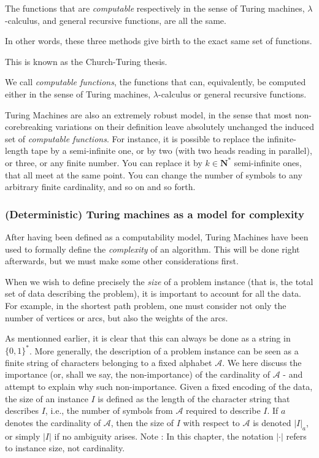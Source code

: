 \begin{theorem}
    The functions that are \textit{computable} respectively in the sense of Turing machines, $ \lambda $-calculus, and general recursive functions, are all the same. 
    
    In other words, these three methods give birth to the exact same set of functions. 
\end{theorem}

This is known as the Church-Turing thesis.

\begin{definition}
    We call \textit{computable functions}, the functions that can, equivalently, be computed either in the sense of Turing machines, $ \lambda $-calculus or general recursive functions.
\end{definition}

Turing Machines are also an extremely robust model, in the sense that most non-corebreaking variations on their definition leave absolutely unchanged the induced set of \textit{computable functions}. For instance, it is possible to replace the infinite-length tape by a semi-infinite one, or by two (with two heads reading in parallel), or three, or any finite number. You can replace it by $k \in \mathbf N^*$ semi-infinite ones, that all meet at the same point. You can change the number of symbols to any arbitrary finite cardinality, and so on and so forth.

\subsubsection{(Deterministic) Turing machines as a model for complexity}

After having been defined as a computability model, Turing Machines have been used to formally define the \textit{complexity} of an algorithm. This will be done right afterwards, but we must make some other considerations first.

When we wish to define precisely the \emph{size} of a problem instance (that is, the total set of data describing the problem), it is important to account for all the data. For example, in the shortest path problem, one must consider not only the number of vertices or arcs, but also the weights of the arcs.

As mentionned earlier, it is clear that this can always be done as a string in $ \{0,1\}^* $. More generally, the description of a problem instance can be seen as a finite string of characters belonging to a fixed alphabet \( \mathcal A \). We here discuss the importance (or, shall we say, the non-importance) of the cardinality of \( \mathcal A \) - and attempt to explain why such non-importance. Given a fixed encoding of the data, the size of an instance \( I \) is defined as the length of the character string that describes \( I \), i.e., the number of symbols from \( \mathcal A \) required to describe \( I \). If \( a \) denotes the cardinality of \( \mathcal A \), then the size of \( I \) with respect to \( \mathcal A \) is denoted \( |I|_a \), or simply \( |I| \) if no ambiguity arises. Note : In this chapter, the notation \( |\cdot| \) refers to instance size, not cardinality.

